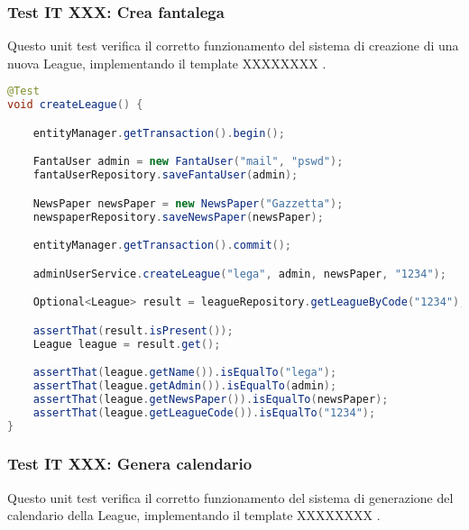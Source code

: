 \subsubsection{Test IT XXX: Crea fantalega}

Questo unit test verifica il corretto funzionamento del sistema di creazione di una nuova League,
implementando il template XXXXXXXX .

\begin{lstlisting}[language=Java]
@Test
void createLeague() {

	entityManager.getTransaction().begin();

	FantaUser admin = new FantaUser("mail", "pswd");
	fantaUserRepository.saveFantaUser(admin);

	NewsPaper newsPaper = new NewsPaper("Gazzetta");
	newspaperRepository.saveNewsPaper(newsPaper);

	entityManager.getTransaction().commit();

	adminUserService.createLeague("lega", admin, newsPaper, "1234");

    Optional<League> result = leagueRepository.getLeagueByCode("1234");

	assertThat(result.isPresent());
	League league = result.get();

	assertThat(league.getName()).isEqualTo("lega");
	assertThat(league.getAdmin()).isEqualTo(admin);
	assertThat(league.getNewsPaper()).isEqualTo(newsPaper);
	assertThat(league.getLeagueCode()).isEqualTo("1234");
}
\end{lstlisting}


\subsubsection{Test IT XXX: Genera calendario}

Questo unit test verifica il corretto funzionamento del sistema di generazione del calendario della League,
implementando il template XXXXXXXX .

